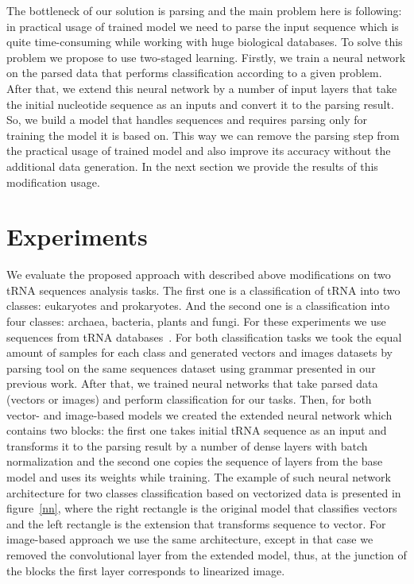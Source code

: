 \documentclass[12pt,a4paper]{cibb}
\begin{document}
The bottleneck of our solution is parsing and the main problem here is following: in practical usage of trained model we need to parse the input sequence which is quite time-consuming while working with huge biological databases.
To solve this problem we propose to use two-staged learning.
Firstly, we train a neural network on the parsed data that performs classification according to a given problem.
After that, we extend this neural network by a number of input layers that take the initial nucleotide sequence as an inputs and convert it to the parsing result.
So, we build a model that handles sequences and requires parsing only for training the model it is based on.
This way we can remove the parsing step from the practical usage of trained model and also improve its accuracy without the additional data generation.
In the next section we provide the results of this modification usage.


\section{\bf Experiments}

We evaluate the proposed approach with described above modifications on two tRNA sequences analysis tasks. 
The first one is a classification of tRNA into two classes: eukaryotes and prokaryotes.
And the second one is a classification into four classes: archaea, bacteria, plants and fungi.
For these experiments we use sequences from tRNA databases~\cite{trnadb1,trnadb2}.
For both classification tasks we took the equal amount of samples for each class and generated vectors and images datasets by parsing tool on the same sequences dataset using grammar presented in our previous work.
After that, we trained neural networks that take parsed data (vectors or images) and perform classification for our tasks.
Then, for both vector- and image-based models we created the extended neural network which contains two blocks: the first one takes initial tRNA sequence as an input and transforms it to the parsing result by a number of dense layers with batch normalization and the second one copies the sequence of layers from the base model and uses its weights while training.
The example of such neural network architecture for two classes classification based on vectorized data is presented in figure~\ref{nn}, where the right rectangle is the original model that classifies vectors and the left rectangle is the extension that transforms sequence to vector.
For image-based approach we use the same architecture, except in that case we removed the convolutional layer from the extended model, thus, at the junction of the blocks the first layer corresponds to linearized image.
\end{document}
